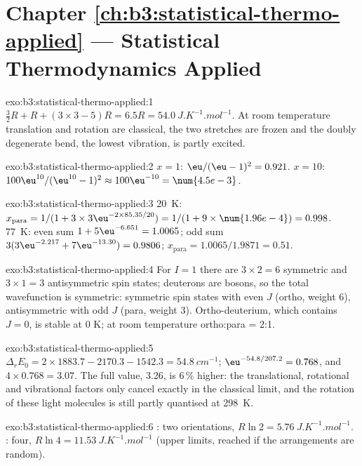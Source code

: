 \section*{Chapter \ref{ch:b3:statistical-thermo-applied} --- Statistical Thermodynamics Applied}

\begin{solution}{exo:b3:statistical-thermo-applied:1}
$\frac32R + R + (3 \times 3 - 5)R = 6.5R = \qty{54.0}{J.K^{-1}.mol^{-1}}$. At room temperature translation
and rotation are classical, the two stretches are frozen and the doubly
degenerate bend, the lowest vibration, is partly excited.
\end{solution}

\begin{solution}{exo:b3:statistical-thermo-applied:2}
$x = 1$: $\eu/(\eu - 1)^2 = 0.921$. $x = 10$: $100\eu^{10}/(\eu^{10} - 1)^2 \approx 100\eu^{-10} = \num{4.5e-3}$.
\end{solution}

\begin{solution}{exo:b3:statistical-thermo-applied:3}
\qty{20}{K}: $x_{\mathrm{para}} = 1/(1 + 3 \times 3\eu^{-2 \times 85.35/20}) = 1/(1 + 9 \times \num{1.96e-4}) = 0.998$.
\qty{77}{K}: even sum $1 + 5\eu^{-6.651} = 1.0065$; odd sum $3(3\eu^{-2.217} + 7\eu^{-13.30}) = 0.9806$;
$x_{\mathrm{para}} = 1.0065/1.9871 = 0.51$.
\end{solution}

\begin{solution}{exo:b3:statistical-thermo-applied:4}
For $I = 1$ there are $3 \times 2 = 6$ symmetric and $3 \times 1 = 3$ antisymmetric spin states;
deuterons are bosons, so the total wavefunction is symmetric: symmetric spin
states with even $J$ (ortho, weight 6), antisymmetric with odd $J$ (para, weight
3). Ortho-deuterium, which contains $J = 0$, is stable at 0 K; at room temperature
ortho:para = 2:1.
\end{solution}

\begin{solution}{exo:b3:statistical-thermo-applied:5}
$\Delta_rE_0 = 2 \times 1883.7 - 2170.3 - 1542.3 = \qty{54.8}{cm^{-1}}$; $\eu^{-54.8/207.2} = 0.768$, and
$4 \times 0.768 = 3.07$. The full value, 3.26, is 6\,\% higher: the translational, rotational and
vibrational factors only cancel exactly in the classical limit, and the
rotation of these light molecules is still partly quantised at \qty{298}{K}.
\end{solution}

\begin{solution}{exo:b3:statistical-thermo-applied:6}
: two orientations, $R\ln2 = \qty{5.76}{J.K^{-1}.mol^{-1}}$. : four, $R\ln4 =
\qty{11.53}{J.K^{-1}.mol^{-1}}$ (upper limits, reached if the arrangements are random).
\end{solution}


